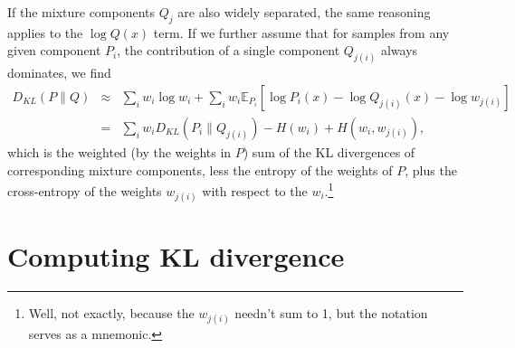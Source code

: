 \documentclass[12pt]{article}
\newcommand{\E}{\mathbb{E}}
\begin{document}
If the mixture components $Q_j$ are also widely separated, the same
reasoning applies to the $\log Q(x)$ term.  If we further assume that
for samples from any given component $P_i$, the contribution of a
single component $Q_{j(i)}$ always dominates, we find
\begin{eqnarray*}
 D_{KL}(P\|Q) & \approx & \sum_i w_i \log w_i + \sum_i w_i \E_{P_i} \left[ \log P_i(x) - \log Q_{j(i)}(x) - \log w_{j(i)} \right] \\
 & = & \sum_i w_i D_{KL}(P_i\|Q_{j(i)}) - H(w_i) + H(w_i, w_{j(i)}),
\end{eqnarray*}
which is the weighted (by the weights in $P$) sum of the KL divergences
of corresponding mixture components, less the entropy of the weights
of $P$, plus the cross-entropy of the weights $w_{j(i)}$ with respect
to the $w_i$.\footnote{Well, not exactly, because the $w_{j(i)}$ needn't
sum to 1, but the notation serves as a mnemonic.}

\section{Computing KL divergence}
\end{document}
